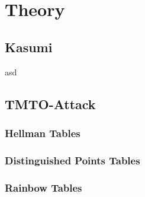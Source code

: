 \chapter{Theory}

\section{Kasumi}

asd

\section{TMTO-Attack}

\subsection{Hellman Tables}

\subsection{Distinguished Points Tables}

\subsection{Rainbow Tables}


